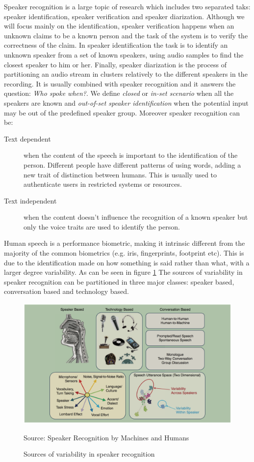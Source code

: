 Speaker recognition is a large topic of research which includes two separated taks: speaker
identification, speaker verification and speaker diarization. Although we will focus mainly on the identification,
speaker verification happens when an unknown claims to be a known person and the task
of the system is to verify the correctness of the claim.
In speaker identification the task is to identify an unknown speaker from a set of known speakers,
using audio samples to find the closest speaker to him or her.
Finally, speaker diarization is the process of partitioning an audio stream in clusters relatively
to the different speakers in the recording. It is usually combined with speaker recognition and it answers
the question: \textit{Who spoke when?}.
We define \textit{closed} or \textit{in-set scenario}
when all the speakers are known and \textit{out-of-set speaker identification} when the potential input
may be out of the predefined speaker group.
Moreover speaker recognition can be:
\begin{description}
        \item[Text dependent] when the content of the speech is important to the
        identification of the person. Different people have different patterns of
        using words, adding a new trait of distinction between humans. This is usually
        used to authenticate users in restricted systems or resources.
        \item[Text independent] when the content doesn't influence the recognition
        of a known speaker but only the voice traits are used to identify the person.
\end{description}
Human speech is a performance biometric, making it intrinsic different from the majority
of the common biometrics (e.g. iris, fingerprints, footprint etc). This is due to the
identification made on how something is said rather than what, with a larger
degree variability. As can be seen in figure \ref{fig:sourcesvar} The sources of variability in speaker recognition can be partitioned
in three major classes: speaker based, conversation based and technology based.

\begin{figure}[h]
\caption{Sources of variability in speaker recognition}
\label{fig:sourcesvar}
\centering
\includegraphics[scale=0.20]{sourcesvariability.png}
\par{Source: Speaker Recognition by Machines and Humans}

\end{figure}

